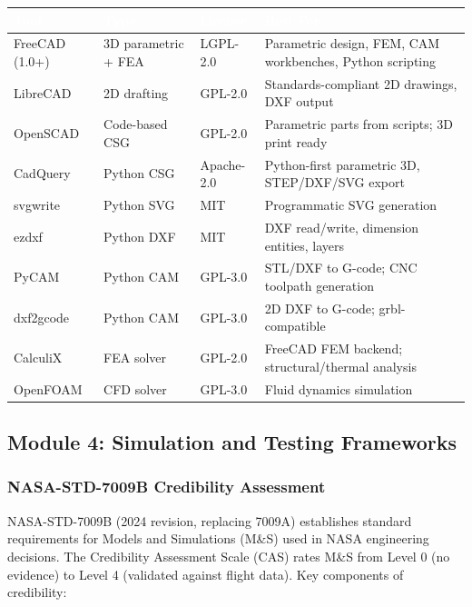 \documentclass[11pt,letterpaper]{article}
\newcommand{\tableheader}[1]{\textbf{\sffamily\textcolor{white}{#1}}}
\begin{document}
\begin{center}
\begin{tabularx}{\textwidth}{L{2.5cm}L{2cm}L{2.5cm}X}
\toprule
{}
\tableheader{Tool} & \tableheader{Type} & \tableheader{License} & \tableheader{Best For} \\
\midrule
FreeCAD (1.0+) & 3D parametric + FEA & LGPL-2.0 & Parametric design, FEM, CAM workbenches, Python scripting \\
LibreCAD & 2D drafting & GPL-2.0 & Standards-compliant 2D drawings, DXF output \\
OpenSCAD & Code-based CSG & GPL-2.0 & Parametric parts from scripts; 3D print ready \\
CadQuery & Python CSG & Apache-2.0 & Python-first parametric 3D, STEP/DXF/SVG export \\
svgwrite & Python SVG & MIT & Programmatic SVG generation \\
ezdxf & Python DXF & MIT & DXF read/write, dimension entities, layers \\
PyCAM & Python CAM & GPL-3.0 & STL/DXF to G-code; CNC toolpath generation \\
dxf2gcode & Python CAM & GPL-3.0 & 2D DXF to G-code; grbl-compatible \\
CalculiX & FEA solver & GPL-2.0 & FreeCAD FEM backend; structural/thermal analysis \\
OpenFOAM & CFD solver & GPL-3.0 & Fluid dynamics simulation \\
\bottomrule
\end{tabularx}
\end{center}

\subsection{Module 4: Simulation and Testing Frameworks}

\subsubsection{NASA-STD-7009B Credibility Assessment}

NASA-STD-7009B (2024 revision, replacing 7009A) establishes standard requirements for Models and Simulations (M\&S) used in NASA engineering decisions. The Credibility Assessment Scale (CAS) rates M\&S from Level 0 (no evidence) to Level 4 (validated against flight data). Key components of credibility:
\end{document}
